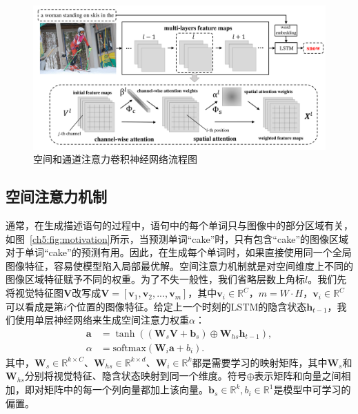 \begin{figure}[tbp]
    \centering
    \includegraphics[width=\linewidth]{chapter5/res/architecture.pdf}
    \caption{空间和通道注意力卷积神经网络流程图}
    \label{ch5:fig:architecture}
\end{figure}

\subsection{空间注意力机制}
通常，在生成描述语句的过程中，语句中的每个单词只与图像中的部分区域有关，如图~\ref{ch5:fig:motivation}所示，当预测单词“cake”时，只有包含“cake”的图像区域对于单词“cake”的预测有用。因此，在生成每个单词时，如果直接使用同一个全局图像特征，容易使模型陷入局部最优解。空间注意力机制就是对空间维度上不同的图像区域特征赋予不同的权重。为了不失一般性，我们省略层数上角标$l$。我们先将视觉特征图$\bm{V}$改写成$\bm{V}  = \left[\bm{v}_1, \bm{v}_2, ..., \bm{v}_m
\right]$，其中$\bm{v}_i\in\mathbb{R}^C$，$m=W\cdot H$，$\bm{v}_i\in\mathbb{R}^C$可以看成是第$i$个位置的图像特征。给定上一个时刻的LSTM的隐含状态$\bm{h}_{t-1}$，我们使用单层神经网络来生成空间注意力权重$\alpha$：
\begin{equation} \label{ch5:eq:eq_5}
\begin{split}
\bm{a} & = \tanh \left( \left( \bm{W}_s \bm{V} + \bm{b}_s \right) \oplus \bm{W}_{hs}\bm{h}_{t-1}\right), \\
\alpha & = \textrm{softmax} \left( \bm{W}_i \bm{a} + b_i \right).
\end{split}
\end{equation}
其中，$\bm{W}_s \in \mathbb{R}^{k \times C}$、$\bm{W}_{hs} \in \mathbb{R}^{k \times d}$、$\bm{W}_i \in \mathbb{R}^k$都是需要学习的映射矩阵，其中$\bm{W}_s$和$\bm{W}_{hs}$分别将视觉特征、隐含状态映射到同一个维度。符号$\oplus$表示矩阵和向量之间相加，即对矩阵中的每一个列向量都加上该向量。$\bm{b}_s \in \mathbb{R}^k, b_i \in \mathbb{R}^1$是模型中可学习的偏置。


